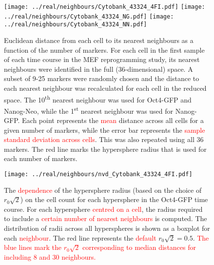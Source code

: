 \documentclass{article}
\newcommand\revised[1]{\textcolor{red}{#1}}
\begin{document}
\begin{figure}[p]
    \begin{center}
        \texttt{[image: ../real/neighbours/Cytobank\_43324\_4FI.pdf]}
        \texttt{[image: ../real/neighbours/Cytobank\_43324\_NG.pdf]}
        \texttt{[image: ../real/neighbours/Cytobank\_43324\_NN.pdf]}          
    \end{center}
    \caption{
        Euclidean distance from each cell to its nearest neighbours as a function of the number of markers.
        For each cell in the first sample of each time course in the MEF reprogramming study, its nearest neighbours were identified in the full (36-dimensional) space.
        A subset of 9-25 markers were randomly chosen and the distance to each nearest neighbour was recalculated for each cell in the reduced space.
        The 10\textsuperscript{th} nearest neighbour was used for Oct4-GFP and Nanog-Neo, while the 1\textsuperscript{st} nearest neighbour was used for Nanog-GFP.
        Each point represents the \revised{mean} distance across all cells for a given number of markers, while the error bar represents the \revised{sample standard deviation across cells}.
        This was also repeated using all 36 markers.
        The red line marks the hypersphere radius that is used for each number of markers.
    }
    \label{fig:radius}
\end{figure}

\begin{figure}[p]
    \begin{center}
        \texttt{[image: ../real/neighbours/nvd\_Cytobank\_43324\_4FI.pdf]}
    \end{center}
    \caption{The \revised{dependence} of the hypersphere radius (based on the choice of $r_0\sqrt{2}$) on the cell count for each hypersphere in the Oct4-GFP time course.
        For each hypersphere \revised{centred on a cell}, the radius required to include a \revised{certain number of nearest neighbours} is computed.
        The distribution of radii across all hyperspheres is shown as a boxplot for each \revised{neighbour}.
        The red line represents the \revised{default} $r_0\sqrt{2}=0.5$.
        \revised{The blue lines mark the $r_0\sqrt{2}$ corresponding to median distances for including 8 and 30 neighbours.}
    }
    \label{fig:nvd}
\end{figure}
\end{document}
